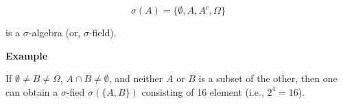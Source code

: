 \documentclass[]{book}
\begin{document}
\[\sigma(A)=\{\emptyset, A, A^c, \Omega\}\]

is a \(\sigma\)-algebra (or, \(\sigma\)-field).

\textbf{Example}

If \(\emptyset \neq B \neq \Omega\), \(A\cap B \neq \emptyset\), and neither \(A\) or \(B\) is a subset of the other, then one can obtain a \(\sigma\)-fied \(\sigma(\{A, B\})\) consisting of 16 element (i.e., \(2^4=16\)).


\end{document}
